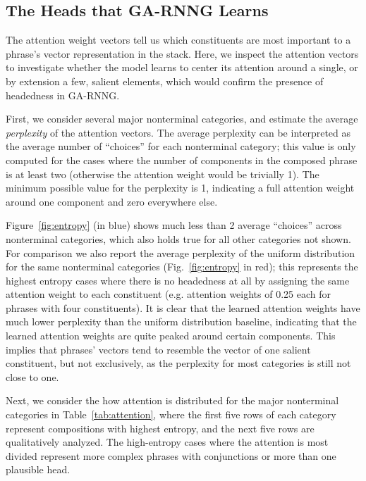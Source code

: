 \documentclass[11pt]{article}
\newcommand{\ask}[1]{\textcolor{orange}{{\textbf{[#1 --\textsc{ask}]}}}}
\newcommand{\cjd}[1]{\textcolor{cyan}{{\textbf{[#1 --\textsc{cjd}]}}}}
\newcommand{\nascomment}[1]{\textcolor{blue}{{\textbf{[#1 --\textsc{nas}]}}}}
\renewcommand{\ask}[1]{}
\renewcommand{\cjd}[1]{}
\renewcommand{\nascomment}[1]{}
\begin{document}
\subsection{The Heads that GA-RNNG Learns}\label{sec:heads_GA_RNNG}

\nascomment{need to figure out -- perplexity or entropy?}\cjd{strongly in favor of ppl}

The attention weight vectors tell us which constituents are most important to a phrase's vector representation in the stack.  Here, we inspect the attention vectors to investigate whether the model learns to center its attention around a single, or by extension a few, salient elements, which would confirm the presence of headedness in GA-RNNG.

First, we consider several major nonterminal categories, and estimate the average \emph{perplexity} of the attention vectors. The average perplexity can be interpreted as the average number of ``choices'' for each nonterminal category; this value is only computed for the cases where the number of components in the composed phrase is at least two (otherwise the attention weight would be trivially 1). The minimum possible value for the perplexity is 1, indicating a full attention weight around one component and zero everywhere else. 

Figure~\ref{fig:entropy} (in blue) shows much less than 2 average ``choices'' across nonterminal categories, which also holds true for all other categories not shown. For comparison we also report the average perplexity of the uniform distribution for the same nonterminal categories (Fig.~\ref{fig:entropy} in red); this represents the highest entropy cases where there is no headedness at all by assigning the same attention weight to each constituent (e.g. attention weights of 0.25 each for phrases with four constituents). It is clear that the learned attention weights have much lower perplexity than the uniform distribution baseline, indicating that the learned attention weights are quite peaked around certain components. This implies that phrases' vectors tend to resemble the vector of one salient constituent, but not exclusively, as the perplexity for most categories is still not close to one. %

Next, we consider the how attention is distributed for the major nonterminal categories in Table~\ref{tab:attention}, where the first five rows of each category represent compositions with highest entropy, and the next five rows are qualitatively analyzed.  The high-entropy cases where the attention is most divided represent more complex phrases with conjunctions or more than one plausible head.\ask{Make sure this is not controversial}
\end{document}
